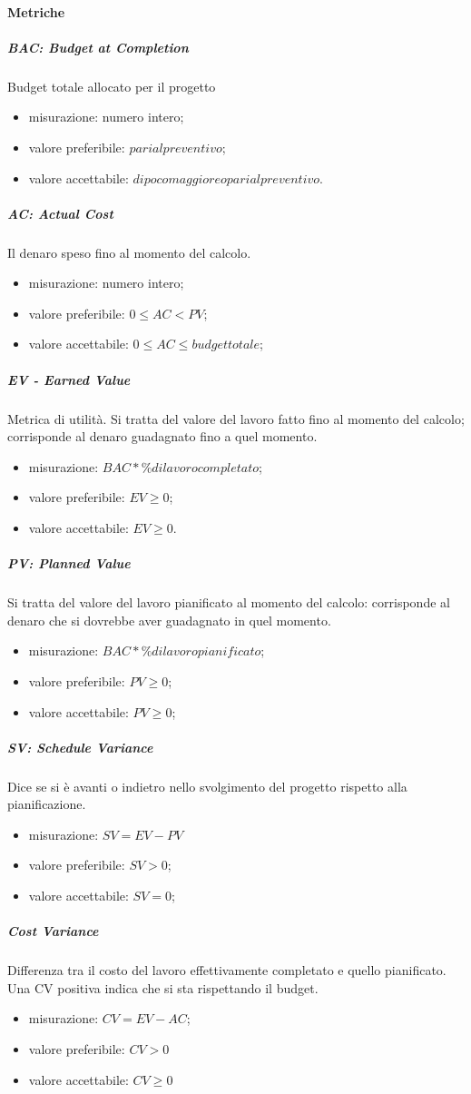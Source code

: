 		\paragraph{Metriche}
			\subparagraph{BAC: Budget at Completion}
			Budget totale allocato per il progetto
			\begin{itemize}
				\item misurazione: numero intero;
				\item valore preferibile: $pari al preventivo$;
				\item valore accettabile: $di poco maggiore o pari al preventivo$.
			\end{itemize}
			\subparagraph{AC: Actual Cost}
			Il denaro speso fino al momento del calcolo.
			\begin{itemize}
				\item  misurazione: numero intero;
				\item  valore preferibile: $0 \leq AC < PV$;
				\item  valore accettabile: $0 \leq AC \leq budget totale$;
			\end{itemize}
			\subparagraph{EV - Earned Value}
			Metrica di utilità. Si tratta del valore del lavoro fatto fino al momento del calcolo; corrisponde al denaro guadagnato fino a quel momento.
			\begin{itemize}
				\item  misurazione: $BAC * \% di lavoro completato$;
				\item  valore preferibile: $EV \geq 0$;
				\item  valore accettabile: $EV \geq 0$.
			\end{itemize}
			\subparagraph{PV: Planned Value}
			Si tratta del valore del lavoro pianificato al momento del calcolo: corrisponde al denaro che si dovrebbe aver guadagnato in quel momento.
			\begin{itemize}
				\item  misurazione: $BAC * \% di lavoro pianificato$;
				\item  valore preferibile: $PV \geq 0$;
				\item  valore accettabile: $PV \geq 0$;
			\end{itemize}			
			\subparagraph{SV: Schedule Variance}
			Dice se si è avanti o indietro nello svolgimento del progetto rispetto alla pianificazione.
			\begin{itemize}
				\item misurazione: $SV = EV - PV$
				\item valore preferibile: $SV > 0$;
				\item valore accettabile: $SV = 0$;
			\end{itemize}
			\subparagraph{Cost Variance}
			Differenza tra il costo del lavoro effettivamente completato e quello pianificato. Una CV positiva indica che si sta rispettando il budget.
			\begin{itemize}
				\item misurazione: $CV = EV - AC$;
				\item valore preferibile: $CV > 0$
				\item valore accettabile: $CV \geq 0$
			\end{itemize}
		
